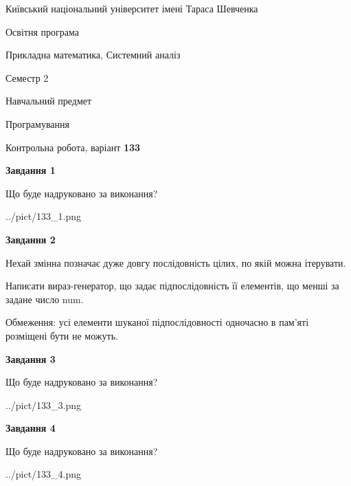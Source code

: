 \documentclass[12pt, ukrainian]{article}
\begin{document}
{{\begin {small}\par
{ \center  Київський національний університет імені Тараса Шевченка \par}
{\parbox {5 cm}{Освітня програма \hfill}{\parbox {8 cm}{Прикладна математика, Системний аналіз \hfill}}\parbox {5 cm}{\hfill Семестр 2}}\par
{\parbox {5 cm} {Навчальний предмет \hfill}\parbox {7 cm}{Програмування \hfill}\parbox {6cm}{\hfill}\par}\vspace{-7pt} \end{small}}{\center Контрольна робота, варіант  \No \textbf
{ 133 }\par}}
{
\begin {large}
{\begin {center}\textbf{Завдання 1}\end {center}}\par
Що буде надруковано за виконання?\par\par
\begin{center}
	{../pict/133_1.png}
\end{center}
\newpage

{\begin {center}\textbf{Завдання 2}\end {center}}\par
Нехай змінна  позначає дуже довгу послідовність цілих, по якій можна ітерувати.

Написати вираз-генератор, що задає підпослідовність її елементів, що менші за задане число num.

Обмеження: усі елементи шуканої підпослідовності одночасно в пам'яті розміщені бути не можуть.\par
\newpage

{\begin {center}\textbf{Завдання 3}\end {center}}\par
Що буде надруковано за виконання?\par
\begin{center}
	{../pict/133_3.png}
\end{center}
\newpage

{\begin {center}\textbf{Завдання 4}\end {center}}\par
Що буде надруковано за виконання?\par
\begin{center}
	{../pict/133_4.png}
\end{center}
\newpage


\end{large}}
\end{document}
